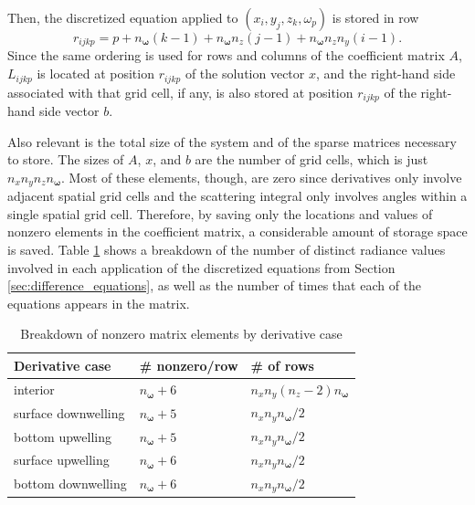 \documentclass[ms,cpyr,lof,lot]{uathesis}
\renewcommand\vec\bm
\newcommand\nomega{{n_{\vec{\omega}}}}
\begin{document}
Then, the discretized equation applied to $(x_i, y_j, z_k, \omega_p)$ is stored in row
\begin{equation*}
  r_{ijkp} = p + \nomega (k-1) + \nomega n_z (j-1) + \nomega n_z n_y (i-1).
\end{equation*}
Since the same ordering is used for rows and columns of the coefficient matrix $A$, $L_{ijkp}$ is located at position $r_{ijkp}$ of the solution vector $x$,
and the right-hand side associated with that grid cell, if any, is also stored at position $r_{ijkp}$ of the right-hand side vector $b$.

Also relevant is the total size of the system and of the sparse matrices necessary to store.
The sizes of $A$, $x$, and $b$ are the number of grid cells, which is just $n_xn_yn_z\nomega$.
Most of these elements, though, are zero since derivatives only involve adjacent spatial grid cells and the scattering integral only involves angles within a single spatial grid cell.
Therefore, by saving only the locations and values of nonzero elements in the coefficient matrix, a considerable amount of storage space is saved.
Table \ref{tab:nonzero} shows a breakdown of the number of distinct radiance values involved in each application of the discretized equations from Section \ref{sec:difference_equations}, as well as the number of times that each of the equations appears in the matrix.

\begin{table}[H]
  \centering
  \begin{tabular}{p{}p{}p{}}
    \toprule
    \textbf{Derivative case} & \textbf{\# nonzero/row} & \textbf{\# of rows} \\
    \midrule
    interior & $\nomega+6$ & $n_xn_y(n_z-2)\nomega$ \\
    surface downwelling & $\nomega+5$ & $n_xn_y\nomega/2$ \\
    bottom upwelling & $\nomega+5$ & $n_xn_y\nomega/2$ \\
    surface upwelling & $\nomega+6$ & $n_xn_y\nomega/2$ \\
    bottom downwelling & $\nomega+6$ & $n_xn_y\nomega/2$ \\
  \end{tabular}
  \caption{Breakdown of nonzero matrix elements by derivative case}
  \label{tab:nonzero}
\end{table}
\end{document}
